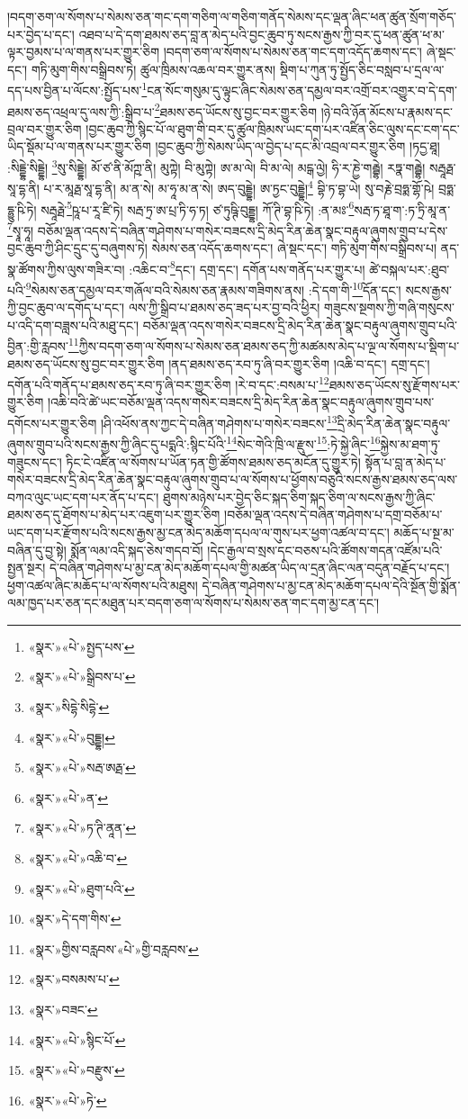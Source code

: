 །བདག་ཅག་ལ་སོགས་པ་སེམས་ཅན་གང་དག་གཅིག་ལ་གཅིག་གནོད་སེམས་དང་ལྡན་ཞིང་ཕན་ཚུན་སྲོག་གཅོད་པར་བྱེད་པ་དང་། འཐབ་པ་དེ་དག་ཐམས་ཅད་བླ་ན་མེད་པའི་བྱང་ཆུབ་ཏུ་སངས་རྒྱས་ཀྱི་བར་དུ་ཕན་ཚུན་ཕ་མ་ལྟར་བྱམས་པ་ལ་གནས་པར་གྱུར་ཅིག །བདག་ཅག་ལ་སོགས་པ་སེམས་ཅན་གང་དག་འདོད་ཆགས་དང་། ཞེ་སྡང་དང་། གཏི་མུག་གིས་བསྒྲིབས་ཏེ། ཚུལ་ཁྲིམས་འཆལ་བར་གྱུར་ནས། སྡིག་པ་ཀུན་ཏུ་སྤྱོད་ཅིང་བསླབ་པ་དྲལ་ལ་དད་པས་བྱིན་པ་ལོངས་:སྤྱོད་པས་\footnote{«སྣར་»«པེ་»སྤྱད་པས་}ངན་སོང་གསུམ་དུ་ལྟུང་ཞིང་སེམས་ཅན་དམྱལ་བར་འགྲོ་བར་འགྱུར་བ་དེ་དག་ཐམས་ཅད་འཕྲལ་དུ་ལས་ཀྱི་:སྒྲིབ་པ་\footnote{«སྣར་»«པེ་»སྒྲིབས་པ་}ཐམས་ཅད་ཡོངས་སུ་བྱང་བར་གྱུར་ཅིག །ཉེ་བའི་ཉོན་མོངས་པ་རྣམས་དང་བྲལ་བར་གྱུར་ཅིག །བྱང་ཆུབ་ཀྱི་སྙིང་པོ་ལ་ཐུག་གི་བར་དུ་ཚུལ་ཁྲིམས་ཡང་དག་པར་འཛིན་ཅིང་ལུས་དང་ངག་དང་ཡིད་སྡོམ་པ་ལ་གནས་པར་གྱུར་ཅིག །བྱང་ཆུབ་ཀྱི་སེམས་ཡིད་ལ་བྱེད་པ་དང་མི་འབྲལ་བར་གྱུར་ཅིག །ཏདྱ་ཐཱ། :སིདྡྷེ་སིདྡྷེ། \footnote{«སྣར་»སིདྷེ་སིདྷེ་}སུ་སིདྡྷེ། མོ་ཙ་ནི་མོཀྵ་ནི། མུཀྟེ། བི་མུཀྟེ། ཨ་མ་ལེ། བི་མ་ལེ། མངྒ་ལྱེ། ཧི་ར་ཎྱེ་གརྦྷེ། རཏྣ་གརྦྷེ། སརྦཱརྠ་སཱ་དྷ་ནི། པ་ར་མཱརྠ་སཱ་དྷ་ནི། མ་ན་སེ། མ་ཧཱ་མ་ན་སེ། ཨད་བུདྡྷེ། ཨ་ཏྱང་བུདྡྷེ།\footnote{«སྣར་»«པེ་»བུདྡྷ།} བྷི་ཏ་བྷ་ཡེ། སུ་བརྞེ་བྲཧྨ་གྷོ་ཥེ། བྲཧྨ་དྷྱུ་ཥི་ཏེ། སརྦཱརྠེ་\footnote{«སྣར་»«པེ་»སརྦ་ཨརྠ་}ཥཱ་པ་རཱ་ཛི་ཏེ། སརྦ་ཏྲ་ཨ་པྲ་ཏི་ཧ་ཏ། ཙ་ཏུཥྚི་བུདྡྷ། ཀོ་ཊི་བྷ་ཥི་ཏེ། :ན་མཿ་\footnote{«སྣར་»«པེ་»ན་}སརྦ་ཏ་ཐཱ་ག་:ཏ་ཏྲི་མཱ་ན་\footnote{«སྣར་»«པེ་»ཏ་ཊི་ནཱན་}སྭཱ་ཧཱ། བཅོམ་ལྡན་འདས་དེ་བཞིན་གཤེགས་པ་གསེར་བཟངས་དྲི་མེད་རིན་ཆེན་སྣང་བརྟུལ་ཞུགས་གྲུབ་པ་དེས་བྱང་ཆུབ་ཀྱི་ཤིང་དྲུང་དུ་བཞུགས་ཏེ། སེམས་ཅན་འདོད་ཆགས་དང་། ཞེ་སྡང་དང་། གཏི་མུག་གིས་བསྒྲིབས་པ། ནད་སྣ་ཚོགས་ཀྱིས་ལུས་གཟིར་བ། :འཆིང་བ་\footnote{«སྣར་»«པེ་»འཆི་བ་}དང་། དགྲ་དང་། དགོན་པས་གནོད་པར་གྱུར་པ། ཚེ་བསྐལ་པར་:ཐུབ་པའི་\footnote{«སྣར་»«པེ་»ཐུག་པའི་}སེམས་ཅན་དམྱལ་བར་གཞོལ་བའི་སེམས་ཅན་རྣམས་གཟིགས་ནས། :དེ་དག་གི་\footnote{«སྣར་»དེ་དག་གིས་}དོན་དང་། སངས་རྒྱས་ཀྱི་བྱང་ཆུབ་ལ་དགོད་པ་དང་། ལས་ཀྱི་སྒྲིབ་པ་ཐམས་ཅད་ཟད་པར་བྱ་བའི་ཕྱིར། གཟུངས་སྔགས་ཀྱི་གཞི་གསུངས་པ་འདི་དག་བཟླས་པའི་མཐུ་དང་། བཅོམ་ལྡན་འདས་གསེར་བཟངས་དྲི་མེད་རིན་ཆེན་སྣང་བརྟུལ་ཞུགས་གྲུབ་པའི་བྱིན་:གྱི་རླབས་\footnote{«སྣར་»གྱིས་བརླབས་«པེ་»གྱི་བརླབས་}ཀྱིས་བདག་ཅག་ལ་སོགས་པ་སེམས་ཅན་ཐམས་ཅད་ཀྱི་མཚམས་མེད་པ་ལྔ་ལ་སོགས་པ་སྡིག་པ་ཐམས་ཅད་ཡོངས་སུ་བྱང་བར་གྱུར་ཅིག །ནད་ཐམས་ཅད་རབ་ཏུ་ཞི་བར་གྱུར་ཅིག །འཆི་བ་དང་། དགྲ་དང་། དགོན་པའི་གནོད་པ་ཐམས་ཅད་རབ་ཏུ་ཞི་བར་གྱུར་ཅིག །རེ་བ་དང་:བསམ་པ་\footnote{«སྣར་»བསམས་པ་}ཐམས་ཅད་ཡོངས་སུ་རྫོགས་པར་གྱུར་ཅིག །འཆི་བའི་ཚེ་ཡང་བཅོམ་ལྡན་འདས་གསེར་བཟངས་དྲི་མེད་རིན་ཆེན་སྣང་བརྟུལ་ཞུགས་གྲུབ་པས་དགོངས་པར་གྱུར་ཅིག །ཤི་འཕོས་ནས་ཀྱང་དེ་བཞིན་གཤེགས་པ་གསེར་བཟངས་\footnote{«སྣར་»བཟང་}དྲི་མེད་རིན་ཆེན་སྣང་བརྟུལ་ཞུགས་གྲུབ་པའི་སངས་རྒྱས་ཀྱི་ཞིང་དུ་པདྨའི་:སྙིང་པོའི་\footnote{«སྣར་»«པེ་»སྙིང་པོ་}སེང་གེའི་ཁྲི་ལ་རྫུས་\footnote{«སྣར་»«པེ་»བརྫུས་}:ཏེ་སྐྱེ་ཞིང་\footnote{«སྣར་»«པེ་»ཏེ་}སྐྱེས་མ་ཐག་ཏུ་གཟུངས་དང་། ཏིང་ངེ་འཛིན་ལ་སོགས་པ་ཡོན་ཏན་གྱི་ཚོགས་ཐམས་ཅད་མངོན་དུ་གྱུར་ཏེ། སྟོན་པ་བླ་ན་མེད་པ་གསེར་བཟངས་དྲི་མེད་རིན་ཆེན་སྣང་བརྟུལ་ཞུགས་གྲུབ་པ་ལ་སོགས་པ་ཕྱོགས་བཅུའི་སངས་རྒྱས་ཐམས་ཅད་ལས་བཀའ་ལུང་ཡང་དག་པར་ནོད་པ་དང་། ཐུགས་མཉེས་པར་བྱེད་ཅིང་སྐད་ཅིག་སྐད་ཅིག་ལ་སངས་རྒྱས་ཀྱི་ཞིང་ཐམས་ཅད་དུ་ཐོགས་པ་མེད་པར་འཇུག་པར་གྱུར་ཅིག །བཅོམ་ལྡན་འདས་དེ་བཞིན་གཤེགས་པ་དགྲ་བཅོམ་པ་ཡང་དག་པར་རྫོགས་པའི་སངས་རྒྱས་མྱ་ངན་མེད་མཆོག་དཔལ་ལ་གུས་པར་ཕྱག་འཚལ་བ་དང་། མཆོད་པ་སྔ་མ་བཞིན་དུ་བྱ་སྟེ། སྨོན་ལམ་འདི་སྐད་ཅེས་གདབ་བོ། །དེང་རྒྱལ་བ་སྲས་དང་བཅས་པའི་ཚོགས་གདན་འཛོམ་པའི་སྤྱན་སྔར། དེ་བཞིན་གཤེགས་པ་མྱ་ངན་མེད་མཆོག་དཔལ་གྱི་མཚན་ཡིད་ལ་དྲན་ཞིང་ལན་བདུན་བརྗོད་པ་དང་། ཕྱག་འཚལ་ཞིང་མཆོད་པ་ལ་སོགས་པའི་མཐུས། དེ་བཞིན་གཤེགས་པ་མྱ་ངན་མེད་མཆོག་དཔལ་དེའི་སྔོན་གྱི་སྨོན་ལམ་ཁྱད་པར་ཅན་དང་མཐུན་པར་བདག་ཅག་ལ་སོགས་པ་སེམས་ཅན་གང་དག་མྱ་ངན་དང་། 